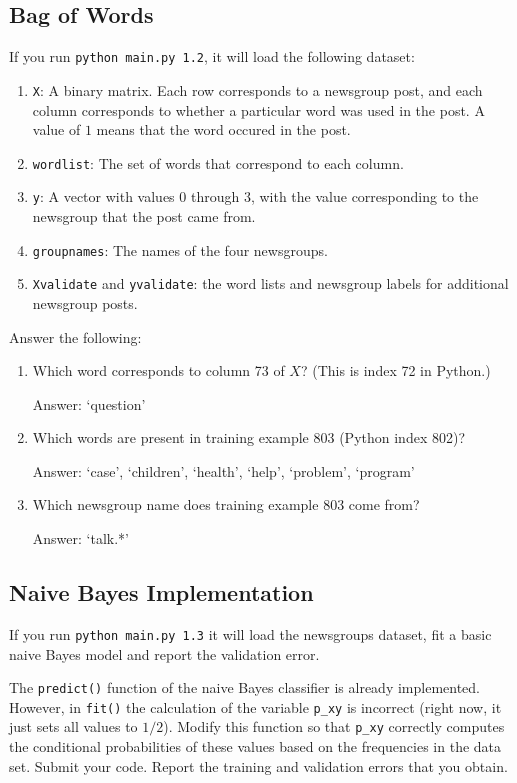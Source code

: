 \documentclass{article}
\def\ans#1{\par\gre{Answer: #1}}
\def\blu#1{{\color{blu}#1}}
\def\gre#1{{\color{gre}#1}}
\let\ask\blu
\begin{document}
\pagebreak

\subsection{Bag of Words}

  If you run \texttt{python main.py 1.2}, it will load the following dataset:
    \begin{enumerate}
        \item \texttt{X}: A binary matrix. Each row corresponds to a newsgroup post, and each column corresponds to whether a particular word was used in the post. A value of $1$ means that the word occured in the post.
        \item \texttt{wordlist}: The set of words that correspond to each column.
        \item \texttt{y}: A vector with values $0$ through $3$, with the value corresponding to the newsgroup that the post came from.
        \item \texttt{groupnames}: The names of the four newsgroups.
        \item \texttt{Xvalidate} and \texttt{yvalidate}: the word lists and newsgroup labels for additional newsgroup posts.
    \end{enumerate}
    \ask{Answer the following}:
    \begin{enumerate}
        \item Which word corresponds to column 73 of $X$? (This is index 72 in Python.)
        \ans {`question'}
        \item Which words are present in training example 803 (Python index 802)?
        \ans {`case', `children', `health', `help', `problem', `program'}
        \item Which newsgroup name does training example 803 come from?
        \ans {`talk.*'}        
    \end{enumerate}

\pagebreak

\subsection{Naive Bayes Implementation}

   If you run \texttt{python main.py 1.3}
    it will load the newsgroups dataset, fit a basic naive Bayes model and report the validation error.

    The \texttt{predict()} function of the naive Bayes classifier is already implemented.
    However, in \texttt{fit()}
    the calculation of the variable \texttt{p\_xy} is incorrect
    (right now, it just sets all values to $1/2$).
    \ask{Modify this function so that \texttt{p\_xy} correctly
        computes the conditional probabilities of these values based on the
        frequencies in the data set. Submit your code. Report the training and validation errors that you obtain.}
        
\end{document}

